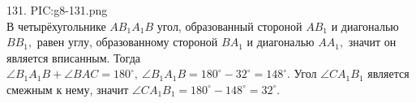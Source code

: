 131. {{PIC:g8-131.png}}\\
В четырёхугольнике $AB_1A_1B$ угол, образованный стороной $AB_1$ и диагональю $BB_1,$ равен углу, образованному стороной $BA_1$ и диагональю $AA_1,$ значит он является вписанным. Тогда $\angle B_1A_1B+\angle BAC=180^\circ,\ \angle B_1A_1B=180^\circ-32^\circ=148^\circ.$ Угол $\angle CA_1B_1$ является смежным к нему, значит $\angle CA_1B_1=180^\circ-148^\circ=32^\circ.$\\
